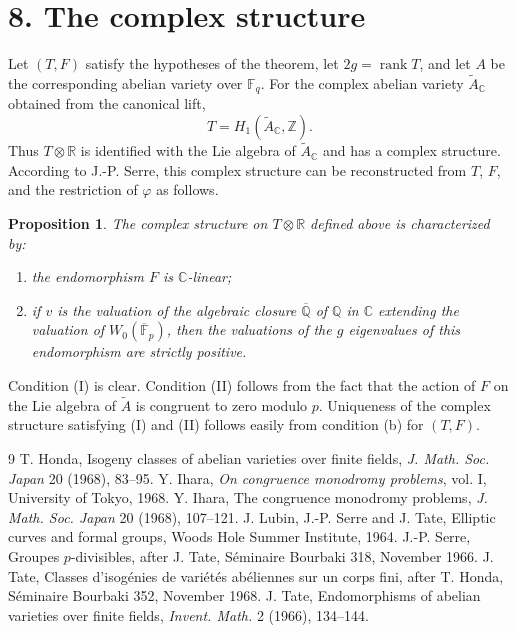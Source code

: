 \documentclass[12pt]{article}
\DeclareMathOperator{\rank}{rank}
\newcommand{\Z}{\mathbb{Z}}
\newcommand{\Q}{\mathbb{Q}}
\newcommand{\R}{\mathbb{R}}
\newcommand{\C}{\mathbb{C}}
\newcommand{\F}{\mathbb{F}}
\theoremstyle{plain}
\newtheorem{proposition}{Proposition}
\theoremstyle{definition}
\theoremstyle{remark}
\begin{document}
\section*{8. The complex structure}
Let $(T,F)$ satisfy the hypotheses of the theorem, let $2g=\rank T$, and let $A$ be the corresponding abelian variety over $\F_q$. For the complex abelian variety $\widetilde A_\C$ obtained from the canonical lift,
\[
 T=H_1(\widetilde A_\C,\Z).
\]
Thus $T\otimes\R$ is identified with the Lie algebra of $\widetilde A_\C$ and has a complex structure. According to J.-P. Serre, this complex structure can be reconstructed from $T$, $F$, and the restriction of $\varphi$ as follows.

\begin{proposition}
The complex structure on $T\otimes\R$ defined above is characterized by:
\begin{enumerate}[label=(\Roman*)]
\item the endomorphism $F$ is $\C$-linear;
\item if $v$ is the valuation of the algebraic closure $\overline{\Q}$ of $\Q$ in $\C$ extending the valuation of $W_0(\overline{\F}_p)$, then the valuations of the $g$ eigenvalues of this endomorphism are strictly positive.
\end{enumerate}
\end{proposition}

Condition (I) is clear. Condition (II) follows from the fact that the action of $F$ on the Lie algebra of $\widetilde A$ is congruent to zero modulo $p$. Uniqueness of the complex structure satisfying (I) and (II) follows easily from condition (b) for $(T,F)$.

\begin{thebibliography}{9}
 T. Honda, Isogeny classes of abelian varieties over finite fields, \emph{J. Math. Soc. Japan} 20 (1968), 83--95.
 Y. Ihara, \emph{On congruence monodromy problems}, vol. I, University of Tokyo, 1968.
 Y. Ihara, The congruence monodromy problems, \emph{J. Math. Soc. Japan} 20 (1968), 107--121.
 J. Lubin, J.-P. Serre and J. Tate, Elliptic curves and formal groups, Woods Hole Summer Institute, 1964.
 J.-P. Serre, Groupes $p$-divisibles, after J. Tate, Séminaire Bourbaki 318, November 1966.
 J. Tate, Classes d'isogénies de variétés abéliennes sur un corps fini, after T. Honda, Séminaire Bourbaki 352, November 1968.
 J. Tate, Endomorphisms of abelian varieties over finite fields, \emph{Invent. Math.} 2 (1966), 134--144.
\end{thebibliography}
\end{document}
